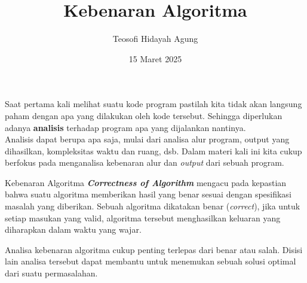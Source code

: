 \documentclass{../praktikum-ppt}
\author[Tew \& ...]{Teosofi Hidayah Agung}
\date{15 Maret 2025}
\title[Alpro 2 - Week 1]{Kebenaran Algoritma}
\institute[Matematika ITS]{Departemen Matematika\\ Institut Teknologi Sepuluh Nopember}
\begin{document}
{
\begin{frame}
  \titlepage
\end{frame}
}


    
    \begin{frame}
        \begin{masalah}
            Saat pertama kali melihat suatu kode program pastilah kita tidak akan langsung paham dengan apa yang dilakukan oleh kode tersebut. Sehingga diperlukan adanya \textbf{analisis} terhadap program apa yang dijalankan nantinya.\\

            Analisis dapat berupa apa saja, mulai dari analisa alur program, output yang dihasilkan, kompleksitas waktu dan ruang, dsb. Dalam materi kali ini kita cukup berfokus pada menganalisa kebenaran alur dan \textit{output} dari sebuah program.
        \end{masalah}
    \end{frame}

    \begin{frame}
      \begin{block}{Kebenaran Algoritma}
        \textit{\textbf{Correctness of Algorithm}} mengacu pada kepastian bahwa suatu algoritma memberikan hasil yang benar sesuai dengan spesifikasi masalah yang diberikan. Sebuah algoritma dikatakan benar (\textit{correct}), jika untuk setiap masukan yang valid, algoritma tersebut menghasilkan keluaran yang diharapkan dalam waktu yang wajar.
      \end{block}
      Analisa kebenaran algoritma cukup penting terlepas dari benar atau salah. Disisi lain analisa tersebut dapat membantu untuk menemukan sebuah solusi optimal dari suatu permasalahan.
    \end{frame}
\end{document}
